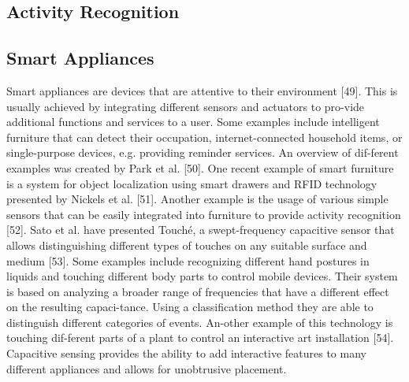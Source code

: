 \subsection{Activity Recognition}
\subsection{Smart Appliances}
Smart appliances are devices that are attentive to their environment [49]. This is usually achieved by integrating different sensors and actuators to pro-vide additional functions and services to a user. Some examples include intelligent furniture that can detect their occupation, internet-connected household items, or single-purpose devices, e.g. providing reminder services. An overview of dif-ferent examples was created by Park et al. [50]. One recent example of smart furniture is a system for object localization using smart drawers and RFID technology presented by Nickels et al. [51]. Another example is the usage of various simple sensors that can be easily integrated into furniture to provide activity recognition [52]. Sato et al. have presented Touché, a swept-frequency capacitive sensor that allows distinguishing different types of touches on any suitable surface and medium [53]. Some examples include recognizing different hand postures in liquids and touching different body parts to control mobile devices. Their system is based on analyzing a broader range of frequencies that have a different effect on the resulting capaci-tance. Using a classification method they are able to distinguish different categories of events. An-other example of this technology is touching dif-ferent parts of a plant to control an interactive art installation  [54]. Capacitive sensing provides the ability to add interactive features to many different appliances and allows for unobtrusive placement.

